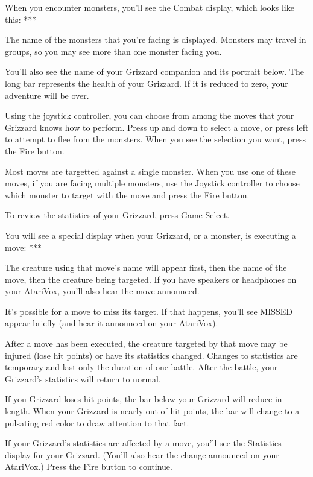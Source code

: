 \documentclass[12pt,twoside]{memoir}
\begin{document}
When you encounter monsters, you'll  see the Combat display, which looks
like this: ***

The name of  the monsters that you're facing is  displayed. Monsters may
travel in groups, so you may see more than one monster facing you.

You'll also  see the name  of your  Grizzard companion and  its portrait
below. The  long bar represents  the health of  your Grizzard. If  it is
reduced to zero, your adventure will be over.

Using the joystick controller, you can  choose from among the moves that
your Grizzard knows how to perform. Press  up and down to select a move,
or press  left to attempt  to flee from the  monsters. When you  see the
selection you want, press the Fire button.

Most moves are  targetted against a single monster. When  you use one of
these  moves, if  you are  facing  multiple monsters,  use the  Joystick
controller to choose which monster to target with the move and press the
Fire button.

To review the statistics of your Grizzard, press Game Select.

You will  see a  special display  when your Grizzard,  or a  monster, is
executing a move: ***

The creature using that move's name  will appear first, then the name of
the move,  then the  creature being  targeted. If  you have  speakers or
headphones on your AtariVox, you'll also hear the move announced.

It's possible for a move to miss its target. If that happens, you'll see
MISSED appear briefly (and hear it announced on your AtariVox).

After a move  has been executed, the creature targeted  by that move may
be injured (lose hit points) or  have its statistics changed. Changes to
statistics  are temporary  and last  only  the duration  of one  battle.
After the battle, your Grizzard's statistics will return to normal.

If  you Grizzard  loses hit  points, the  bar below  your Grizzard  will
reduce in  length. When your Grizzard  is nearly out of  hit points, the
bar will change to a pulsating red color to draw attention to that fact.

If your  Grizzard's statistics are  affected by  a move, you'll  see the
Statistics  display for  your  Grizzard. (You'll  also  hear the  change
announced on your AtariVox.) Press the Fire button to continue.
\end{document}
